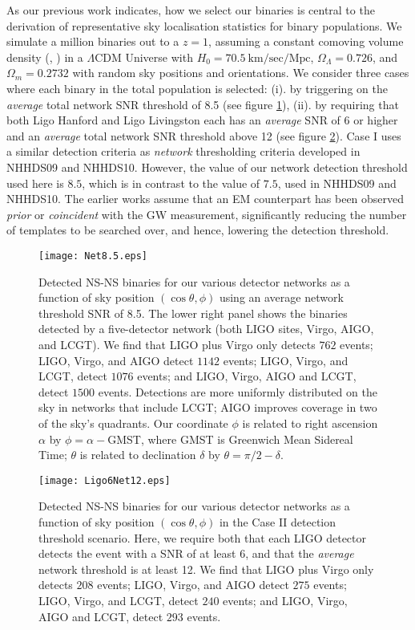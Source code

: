 \documentclass{emulateapj}
\begin{document}
As our previous work indicates, how we select our binaries is central
to the derivation of representative sky localisation statistics for binary
populations. We simulate a million binaries out to a $z = 1$,
assuming a constant comoving volume density  (\citealt{peebles93},
\citealt{hogg99}) in a $\Lambda$CDM Universe with
$H_0=70.5\ \mbox{km}/\mbox{sec}/\mbox{Mpc}$, $\Omega_{\Lambda}=0.726$,
and $\Omega_{m}=0.2732$ \citep{komatsu09} with random sky positions and orientations. We
consider three cases where each binary in the total population is selected: (i). by triggering on
the {\sl average} total network SNR threshold of 8.5 (see figure \ref{fig:detected_binaries_caseI}), (ii). by requiring that both Ligo
Hanford and Ligo Livingston each has an {\sl average} SNR of 6 or
higher and an {\sl average} total network SNR threshold above 12 (see figure \ref{fig:detected_binaries_caseII}). Case I uses a similar detection
criteria as {\sl network} thresholding criteria developed in
NHHDS09 and NHHDS10. However, the value of our network detection
threshold used here is
$8.5$, which is in contrast to the value of $7.5$, used in NHHDS09 and NHHDS10.
The earlier works assume that an EM counterpart has been observed {\sl
  prior} or {\sl coincident} with the GW measurement, significantly
reducing the number of templates to be searched over, and hence,
lowering the detection threshold.

\begin{figure}[t]
\centering 
\texttt{[image: Net8.5.eps]}
\caption{Detected NS-NS binaries for our various detector networks as
a function of sky position $(\cos\theta,\phi)$ using an average
network threshold SNR of 8.5.  The lower right panel
shows the binaries detected by a five-detector network (both LIGO
sites, Virgo, AIGO, and LCGT).  We find that LIGO plus Virgo only detects $762$ events;
LIGO, Virgo, and AIGO detect $1142$ events; LIGO, Virgo,
and LCGT, detect $1076$ events; and  LIGO, Virgo, AIGO
and LCGT, detect $1500$ events.  Detections are more
uniformly distributed on the sky in networks that include LCGT; AIGO
improves coverage in two of the sky's quadrants.  Our coordinate
$\phi$ is related to right ascension $\alpha$ by $\phi=\alpha-$GMST,
where GMST is Greenwich Mean Sidereal Time; $\theta$ is related to
declination $\delta$ by $\theta = \pi/2 - \delta$.}
\label{fig:detected_binaries_caseI}
\end{figure} 

\begin{figure}[t]
\centering 
\texttt{[image: Ligo6Net12.eps]}
\caption{Detected NS-NS binaries for our various detector networks as
a function of sky position $(\cos\theta,\phi)$ in the Case II
detection threshold scenario. Here, we require both that each LIGO detector
detects the event with a SNR of at least 6, and that the {\sl average}
network threshold is at least 12. We find that LIGO plus Virgo only detects $208$ events;
LIGO, Virgo, and AIGO detect $275$ events; LIGO, Virgo,
and LCGT, detect $240$ events; and  LIGO, Virgo, AIGO
and LCGT, detect $293$ events.  }
\label{fig:detected_binaries_caseII}
\end{figure}
\end{document}
